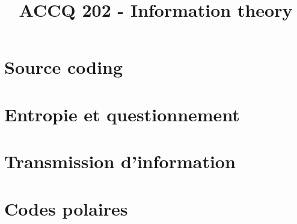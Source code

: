\documentclass[a4paper,11pt]{article}
\title{\vspace{-1.2cm} \textbf{ACCQ 202 - Information theory}}
\begin{document}
\maketitle

\vspace{-1.5cm}

\section{Source coding}

	

\section{Entropie et questionnement}

	

\section{Transmission d'information}

	

\section{Codes polaires}

	
\end{document}
